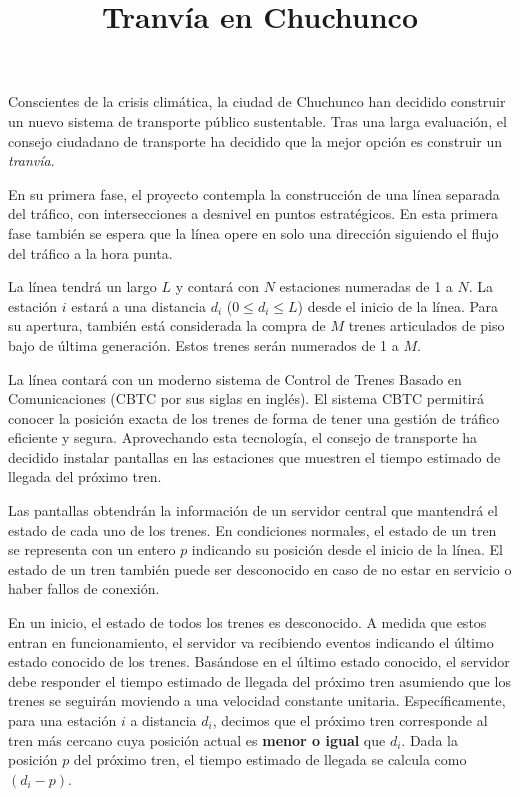 \documentclass{oci}
\title{Tranvía en Chuchunco}
\begin{document}
\begin{problemDescription}
  Conscientes de la crisis climática, la ciudad de Chuchunco
  han decidido construir un nuevo sistema de transporte
  público sustentable.
  Tras una larga evaluación, el consejo ciudadano de
  transporte ha decidido que la mejor opción es construir un
  \emph{tranvía}.

  En su primera fase, el proyecto contempla la
  construcción de una línea separada del tráfico, con
  intersecciones a desnivel en puntos estratégicos.
  En esta primera fase también se espera que la línea
  opere en solo una dirección siguiendo el flujo del
  tráfico a la hora punta.

  La línea tendrá un largo $L$ y contará con $N$
  estaciones numeradas de 1 a $N$.
  La estación $i$ estará a una distancia $d_i$
  ($0 \leq d_i \leq L$) desde el inicio de la línea.
  Para su apertura, también está considerada la
  compra de $M$ trenes articulados de piso bajo
  de última generación.
  Estos trenes serán numerados de 1 a $M$.

  La línea contará con un moderno sistema de
  Control de Trenes Basado en Comunicaciones
  (CBTC por sus siglas en inglés).
  El sistema CBTC permitirá conocer la posición
  exacta de los trenes de forma de tener una
  gestión de tráfico eficiente y segura.
  Aprovechando esta tecnología, el consejo de
  transporte ha decidido instalar pantallas en las
  estaciones que muestren el tiempo estimado de
  llegada del próximo tren.

  Las pantallas obtendrán la información de un
  servidor central que mantendrá el estado
  de cada uno de los trenes.
  En condiciones normales, el estado de un tren
  se representa con un entero $p$ indicando
  su posición desde el inicio de la línea.
  El estado de un tren también puede ser desconocido
  en caso de no estar en servicio o haber fallos
  de conexión.

  En un inicio, el estado de todos los trenes es
  desconocido.
  A medida que estos entran en funcionamiento, el
  servidor va recibiendo eventos indicando el
  último estado conocido de los trenes.
  Basándose en el último estado conocido, el servidor
  debe responder el tiempo estimado de llegada del
  próximo tren asumiendo que los trenes se seguirán
  moviendo a una velocidad constante unitaria.
  Específicamente, para una estación $i$ a distancia $d_i$,
  decimos que el próximo tren corresponde al tren más cercano
  cuya posición actual es \textbf{menor o igual} que $d_i$.
  Dada la posición $p$ del próximo tren, el tiempo estimado
  de llegada se calcula como $(d_i - p)$.


\end{problemDescription}
\end{document}
